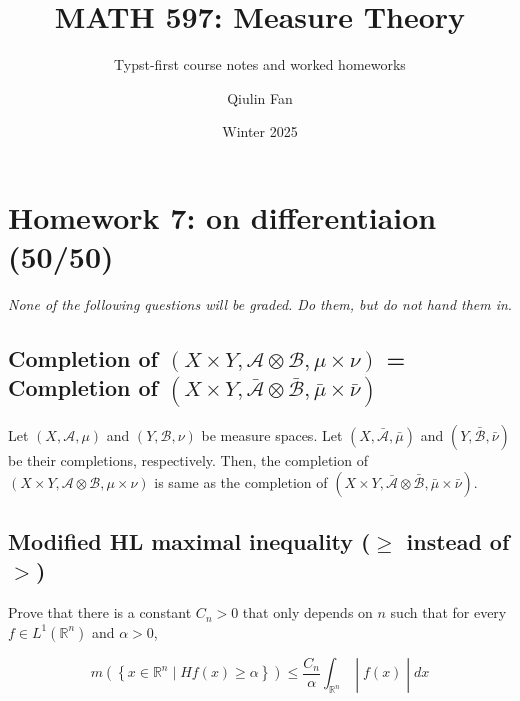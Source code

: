 \documentclass{qlnotes-export}
\title{MATH 597: Measure Theory}
\subtitle{Typst-first course notes and worked homeworks}
\author{Qiulin Fan}
\date{Winter 2025}
\begin{document}
\mainmatter
\chapter{Homework 7: on differentiaion (50/50)}\label{homework-7-on-differentiaion-5050}

\emph{None of the following questions will be graded. Do them, but do not hand them in}.

\section{\texorpdfstring{Completion of \((X \times Y,\mathcal{A} \otimes \mathcal{B},\mu \times \nu)\) = Completion of \((X \times Y,\bar{\mathcal{A}} \otimes \bar{\mathcal{B}},\bar{\mu} \times \bar{\nu})\)}{Completion of (X \textbackslash times Y,\textbackslash mathcal\{A\} \textbackslash otimes \textbackslash mathcal\{B\},\textbackslash mu \textbackslash times \textbackslash nu) = Completion of (X \textbackslash times Y,\textbackslash bar\{\textbackslash mathcal\{A\}\} \textbackslash otimes \textbackslash bar\{\textbackslash mathcal\{B\}\},\textbackslash bar\{\textbackslash mu\} \textbackslash times \textbackslash bar\{\textbackslash nu\})}}\label{completion-of-xtimes-y-mathcalaotimes-mathcalb-mutimes-nu-completion-of-xtimes-y-barmathcalaotimes-barmathcalb-barmutimes-barnu}

Let \((X,\mathcal{A},\mu)\) and \((Y,\mathcal{B},\nu)\) be measure spaces. Let \((X,\bar{\mathcal{A}},\bar{\mu})\) and \((Y,\bar{\mathcal{B}},\bar{\nu})\) be their completions, respectively. Then, the completion of \((X \times Y,\mathcal{A} \otimes \mathcal{B},\mu \times \nu)\) is same as the completion of \((X \times Y,\bar{\mathcal{A}} \otimes \bar{\mathcal{B}},\bar{\mu} \times \bar{\nu})\).

\section{\texorpdfstring{Modified HL maximal inequality (\(\geq\) instead of \(>\))}{Modified HL maximal inequality (\textbackslash geq instead of \textgreater)}}\label{modified-hl-maximal-inequality-geq-instead-of}

Prove that there is a constant \(C_{n} > 0\) that only depends on \(n\) such that for every \(f \in L^{1}({\mathbb{R}}^{n})\) and \(\alpha > 0\),

\[\left. m(\left\{ {x \in {\mathbb{R}}^{n} \mid Hf(x) \geq \alpha} \right\}) \leq \frac{C_{n}}{\alpha}\int_{{\mathbb{R}}^{n}} \middle| f(x) \middle| dx \right.\]
\end{document}
